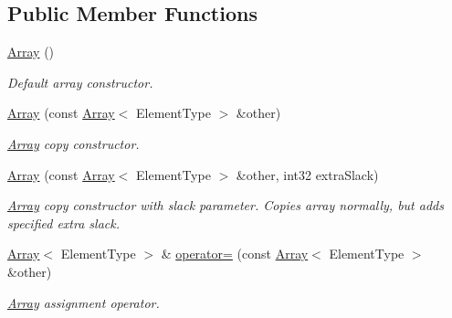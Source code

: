 \subsection*{Public Member Functions}
\begin{DoxyCompactItemize}
\item 
\mbox{\label{class_arcana_1_1_array_addac09b78eaea1ef29ccc06320478eca}} 
\mbox{\hyperlink{class_arcana_1_1_array_addac09b78eaea1ef29ccc06320478eca}{Array}} ()
\begin{DoxyCompactList}\small\item\em Default array constructor. \end{DoxyCompactList}\item 
\mbox{\label{class_arcana_1_1_array_a86acb91bd19f5c18d48ddf1e76b004c1}} 
\mbox{\hyperlink{class_arcana_1_1_array_a86acb91bd19f5c18d48ddf1e76b004c1}{Array}} (const \mbox{\hyperlink{class_arcana_1_1_array}{Array}}$<$ Element\+Type $>$ \&other)
\begin{DoxyCompactList}\small\item\em \mbox{\hyperlink{class_arcana_1_1_array}{Array}} copy constructor. \end{DoxyCompactList}\item 
\mbox{\label{class_arcana_1_1_array_a9b81cbd9e686a53c8d307e35740d981a}} 
\mbox{\hyperlink{class_arcana_1_1_array_a9b81cbd9e686a53c8d307e35740d981a}{Array}} (const \mbox{\hyperlink{class_arcana_1_1_array}{Array}}$<$ Element\+Type $>$ \&other, int32 extra\+Slack)
\begin{DoxyCompactList}\small\item\em \mbox{\hyperlink{class_arcana_1_1_array}{Array}} copy constructor with slack parameter. Copies array normally, but adds specified extra slack. \end{DoxyCompactList}\item 
\mbox{\label{class_arcana_1_1_array_ad25159a8deca52693caaf9dd39b61fd3}} 
\mbox{\hyperlink{class_arcana_1_1_array}{Array}}$<$ Element\+Type $>$ \& \mbox{\hyperlink{class_arcana_1_1_array_ad25159a8deca52693caaf9dd39b61fd3}{operator=}} (const \mbox{\hyperlink{class_arcana_1_1_array}{Array}}$<$ Element\+Type $>$ \&other)
\begin{DoxyCompactList}\small\item\em \mbox{\hyperlink{class_arcana_1_1_array}{Array}} assignment operator. \end{DoxyCompactList}\item 

\end{DoxyCompactItemize}
